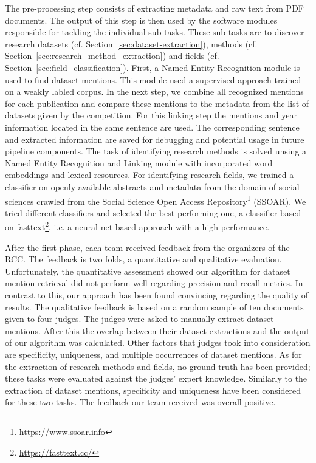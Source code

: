 The pre-processing step consists of extracting metadata and raw text from PDF documents.
The output of this step is then used by the software modules responsible for tackling the individual sub-tasks.
These sub-tasks are to discover research datasets (cf. Section~\ref{sec:dataset-extraction}), methods (cf. Section~\ref{sec:research_method_extraction}) and fields (cf. Section~\ref{sec:field_classification}).
First, a Named Entity Recognition module is used to find dataset mentions.
This module used a supervised approach trained on a weakly labled corpus.
In the next step, we combine all recognized mentions for each publication and compare these mentions to the metadata from the list of datasets given by the competition. %
For this linking step the mentions and year information located in the same sentence are used.
The corresponding sentence and extracted information are saved for debugging and potential usage in future pipeline components.
The task of identifying research methods is solved unsing a Named Entity Recognition and Linking module with incorporated word embeddings and lexical resources. 
For identifying research fields, we trained a classifier on openly available abstracts and metadata from the domain of social sciences crawled from the Social Science Open Access Repository\footnote{\url{https://www.ssoar.info}} (SSOAR).
We tried different classifiers and selected the best performing one, a classifier based on fasttext\footnote{\url{https://fasttext.cc/}}, i.e. a neural net based approach with a high performance\cite{joulin2017bag}.



After the first phase, each team received feedback from the organizers of the RCC.
The feedback is two folds, a quantitative and qualitative evaluation.
Unfortunately, the quantitative assessment showed our algorithm for dataset mention retrieval did not perform well regarding precision and recall metrics.
In contrast to this, our approach has been found convincing regarding the quality of results.
The qualitative feedback is based on a random sample of ten documents given to four judges.
The judges were asked to manually extract dataset mentions.
After this the overlap between their dataset extractions and the output of our algorithm was calculated.
Other factors that judges took into consideration are specificity, uniqueness, and multiple occurrences of dataset mentions.
As for the extraction of research methods and fields, no ground truth has been provided; these tasks were evaluated against the judges' expert knowledge.
Similarly to the extraction of dataset mentions, specificity and uniqueness have been considered for these two tasks.
The feedback our team received was overall positive.

